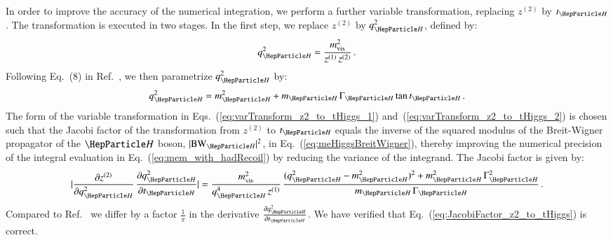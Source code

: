 In order to improve the accuracy of the numerical integration,
we perform a further variable transformation, replacing $z^{(2)}$ by $t_{\PHiggs}$.
The transformation is executed in two stages. 
In the first step, we replace $z^{(2)}$ by $q_{\PHiggs}^{2}$, defined by:
\begin{equation}
q_{\PHiggs}^{2} = \frac{m^{2}_{\vis}}{z^{(1)} \, z^{(2)}} \, .
\label{eq:varTransform_z2_to_tHiggs_1}
\end{equation}
Following Eq.~(8) in Ref.~\cite{Alwall:2010cq}, we then parametrize $q_{\PHiggs}^{2}$ by:
\begin{equation}
q_{\PHiggs}^{2} = m_{\PHiggs}^{2} + m_{\PHiggs} \, \Gamma_{\PHiggs}
\tan t_{\PHiggs} \, .
\label{eq:varTransform_z2_to_tHiggs_2}
\end{equation}
The form of the variable transformation in Eqs.~(\ref{eq:varTransform_z2_to_tHiggs_1}) and~(\ref{eq:varTransform_z2_to_tHiggs_2}) 
is chosen such that the Jacobi factor of the transformation from
$z^{(2)}$ to $t_{\PHiggs}$ equals the inverse of the squared modulus
of the Breit-Wigner propagator of the $\PHiggs$ boson, $\vert \BW_{\PHiggs} \vert^{2}$, in Eq.~(\ref{eq:meHiggsBreitWigner}),
thereby improving the numerical precision of the integral evaluation
in Eq.~(\ref{eq:mem_with_hadRecoil}) by 
reducing the variance of the integrand.
The Jacobi factor is given by:
\begin{equation}
\vert \frac{\partial z^{(2)}}{\partial q_{\PHiggs}^{2}} \, \frac{\partial
  q_{\PHiggs}^{2}}{\partial t_{\PHiggs}} \vert =
\frac{m^{2}_{\vis}}{q_{\PHiggs}^{4} \, z^{(1)}} \, \frac{(q_{\PHiggs}^{2}
  - m_{\PHiggs}^{2})^{2} + m_{\PHiggs}^{2} \,
  \Gamma_{\PHiggs}^{2}}{m_{\PHiggs} \, \Gamma_{\PHiggs}} \, .
\label{eq:JacobiFactor_z2_to_tHiggs}  
\end{equation}
Compared to Ref.~\cite{Alwall:2010cq} we differ by a factor $\frac{1}{\pi}$ in the derivative 
$\frac{\partial q_{\PHiggs}^{2}}{\partial t_{\PHiggs}}$. We have verified that Eq.~(\ref{eq:JacobiFactor_z2_to_tHiggs}) is correct.

